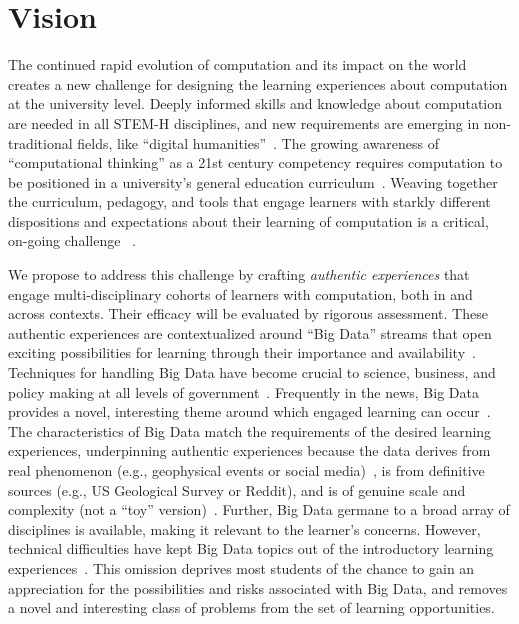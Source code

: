 \documentclass[11pt]{article}
\begin{document}
\newcommand{\NP}{\mbox{${\cal NP}$}}
\renewcommand{\floatpagefraction}{.90} %
\renewcommand{\textfraction}{.10}

\pagestyle{empty}

\section{Vision}
The continued rapid evolution of computation and its impact on the world creates a new challenge for designing the learning experiences about computation at the university level.
Deeply informed skills and knowledge about computation are needed in all STEM-H disciplines, and new requirements are emerging in non-traditional fields, like ``digital humanities''~\cite{day2011,bundy2007}.
The growing awareness of ``computational thinking'' as a 21st century competency requires computation to be positioned in a university's general education curriculum~\cite{wing2006}.
Weaving together the curriculum, pedagogy, and tools that engage learners with starkly different dispositions and expectations about their learning of computation is a critical, on-going challenge ~\cite{weinberg2013, Cordova}.

We propose to address this challenge by crafting \textit{authentic experiences} that engage multi-disciplinary cohorts of learners with computation, both in and across contexts.
Their efficacy will be evaluated by rigorous assessment.
These authentic experiences are contextualized around ``Big Data''
streams that open exciting possibilities for learning through their
importance and availability~\cite{McKinsey}.
Techniques for handling Big Data have become crucial to science, business, and policy making at all levels of government~\cite{theory-end}.
Frequently in the news, Big Data provides a novel, interesting theme around which engaged learning can occur~\cite{knobelsdorf2007computer}.
The characteristics of Big Data match the requirements of the desired learning experiences, underpinning authentic experiences because the data derives from real phenomenon (e.g., geophysical events or social media)~\cite{Egger, Waldman}, is from definitive sources (e.g., US Geological Survey or Reddit), and is of genuine scale and complexity (not a ``toy'' version)~\cite{Anderson}.
Further, Big Data germane to a broad array of disciplines is available, making it relevant to the learner's concerns.
However, technical difficulties have kept Big Data topics out of the introductory learning experiences~\cite{McKinsey}.
This omission deprives most students of the chance to gain an appreciation for the possibilities and risks associated with Big Data, and removes a novel and interesting class of problems from the set of learning opportunities.
\end{document}
